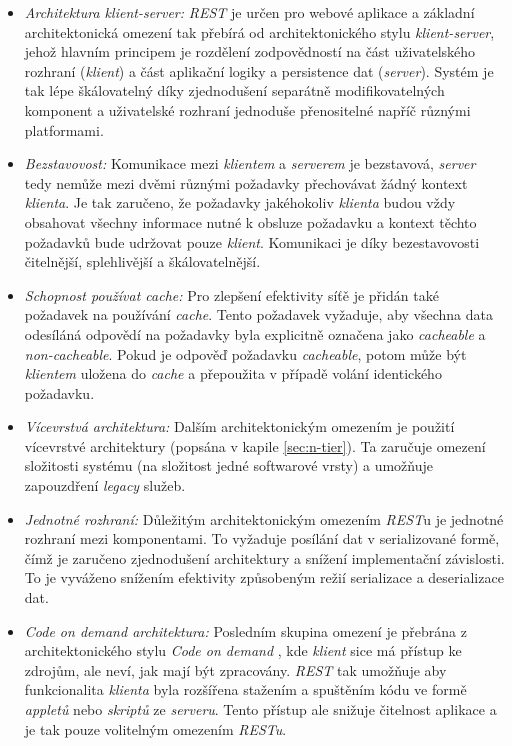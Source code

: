 \begin{itemize}
  \item{\textit{Architektura klient-server:}} \textit{REST} je určen pro webové aplikace a základní architektonická omezení tak přebírá od architektonického stylu \textit{klient-server}, jehož hlavním principem je rozdělení zodpovědností na část uživatelského rozhraní (\textit{klient}) a část aplikační logiky a persistence dat (\textit{server}). Systém je tak lépe škálovatelný díky zjednodušení separátně modifikovatelných komponent \cite{Pautasso08} a uživatelské rozhraní jednoduše přenositelné napříč různými platformami.
  \item{\textit{Bezstavovost:}} Komunikace mezi \textit{klientem} a \textit{serverem} je bezstavová, \textit{server} tedy nemůže mezi dvěmi různými požadavky přechovávat žádný kontext \textit{klienta}. Je tak zaručeno, že požadavky jakéhokoliv \textit{klienta} budou vždy obsahovat všechny informace nutné k obsluze požadavku a kontext těchto požadavků bude udržovat pouze \textit{klient}. 
  Komunikaci je díky bezestavovosti čitelnější, splehlivější a škálovatelnější.
  \item{\textit{Schopnost používat cache:}} Pro zlepšení efektivity síťě je přidán také požadavek na používání \textit{cache}. Tento požadavek vyžaduje, aby všechna data odesíláná odpovědí na požadavky byla explicitně označena jako \textit{cacheable} a \textit{non-cacheable}. Pokud je odpověď požadavku \textit{cacheable}, potom může být \textit{klientem} uložena do \textit{cache} a přepoužita v případě volání identického požadavku. 
  \item{\textit{Vícevrstvá architektura:}} Dalším architektonickým omezením je použití vícevrstvé architektury (popsána v kapile \ref{sec:n-tier}). Ta zaručuje omezení složitosti systému (na složitost jedné softwarové vrsty) a umožňuje zapouzdření \textit{legacy} služeb.
  \item{\textit{Jednotné rozhraní:}} Důležitým architektonickým omezením \textit{REST}u je jednotné rozhraní mezi komponentami. To vyžaduje posílání dat v serializované formě, čímž je zaručeno zjednodušení architektury a snížení implementační závislosti. To je vyváženo snížením efektivity způsobeným režií serializace a deserializace dat.  
  \item{\textit{Code on demand architektura:}} Posledním skupina omezení je přebrána z architektonického stylu \textit{Code on demand} \cite{Fuggetta98}, kde \textit{klient} sice má přístup ke zdrojům, ale neví, jak mají být zpracovány. \textit{REST} tak umožňuje aby funkcionalita \textit{klienta} byla rozšířena stažením a spuštěním kódu ve formě \textit{appletů} nebo \textit{skriptů} ze \textit{serveru}. Tento přístup ale snižuje čitelnost aplikace a je tak pouze volitelným omezením \textit{RESTu}.
\end{itemize}  

